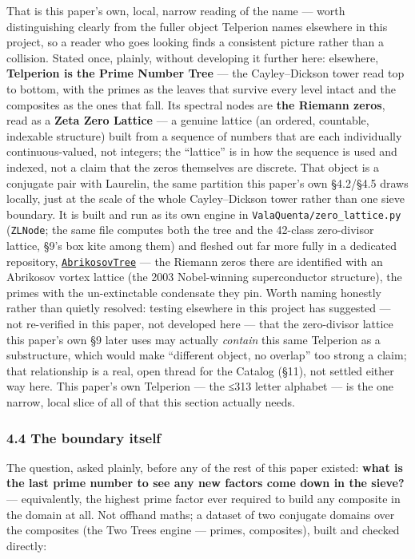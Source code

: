 \documentclass[
  10pt,
]{article}
\begin{document}
That is this paper's own, local, narrow reading of the name --- worth
distinguishing clearly from the fuller object Telperion names elsewhere
in this project, so a reader who goes looking finds a consistent picture
rather than a collision. Stated once, plainly, without developing it
further here: elsewhere, \textbf{Telperion is the Prime Number Tree} ---
the Cayley--Dickson tower read top to bottom, with the primes as the
leaves that survive every level intact and the composites as the ones
that fall. Its spectral nodes are \textbf{the Riemann zeros}, read as a
\textbf{Zeta Zero Lattice} --- a genuine lattice (an ordered, countable,
indexable structure) built from a sequence of numbers that are each
individually continuous-valued, not integers; the ``lattice'' is in how
the sequence is used and indexed, not a claim that the zeros themselves
are discrete. That object is a conjugate pair with Laurelin, the same
partition this paper's own §4.2/§4.5 draws locally, just at the scale of
the whole Cayley--Dickson tower rather than one sieve boundary. It is
built and run as its own engine in \texttt{ValaQuenta/zero\_lattice.py}
(\texttt{ZLNode}; the same file computes both the tree and the 42-class
zero-divisor lattice, §9's box kite among them) and fleshed out far more
fully in a dedicated repository,
\href{https://github.com/michaelrendier/AbrikosovTree}{\texttt{AbrikosovTree}}
--- the Riemann zeros there are identified with an Abrikosov vortex
lattice (the 2003 Nobel-winning superconductor structure), the primes
with the un-extinctable condensate they pin. Worth naming honestly
rather than quietly resolved: testing elsewhere in this project has
suggested --- not re-verified in this paper, not developed here --- that
the zero-divisor lattice this paper's own §9 later uses may actually
\emph{contain} this same Telperion as a substructure, which would make
``different object, no overlap'' too strong a claim; that relationship
is a real, open thread for the Catalog (§11), not settled either way
here. This paper's own Telperion --- the ≤313 letter alphabet --- is the
one narrow, local slice of all of that this section actually needs.

\hypertarget{the-boundary-itself}{%
\subsubsection{4.4 The boundary itself}\label{the-boundary-itself}}

The question, asked plainly, before any of the rest of this paper
existed: \textbf{what is the last prime number to see any new factors
come down in the sieve?} --- equivalently, the highest prime factor ever
required to build any composite in the domain at all. Not offhand maths;
a dataset of two conjugate domains over the composites (the Two Trees
engine --- primes, composites), built and checked directly:
\end{document}
